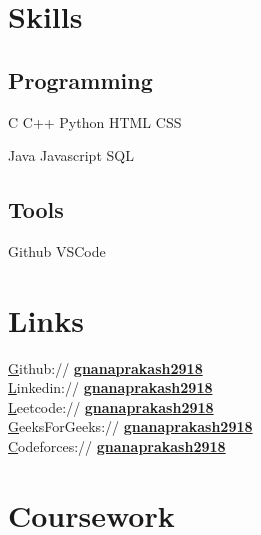 \documentclass[]{deedy-resume-openfont}
\begin{document}
\begin{minipage}[t]{0.33\textwidth}

    \section{Skills}
    \subsection{Programming}
    C \textbullet{} C++ \textbullet{}  Python \textbullet{} HTML \textbullet{} CSS

    Java \textbullet{} Javascript \textbullet{} SQL
    \sectionsep

    \subsection{Tools}
    Github \textbullet{} VSCode


    \section{Links}

    \href{https://github.com/gnanaprakash2918}
    Github:// \href{https://github.com/gnanaprakash2918}{\bf gnanaprakash2918} \\

    \href{https://www.linkedin.com/in/gnanaprakash2918/}
    Linkedin://  \href{https://www.linkedin.com/in/gnanaprakash2918/}{\bf gnanaprakash2918} \\

    \href{https://leetcode.com/gnanaprakash2918/}
    Leetcode://  \href{https://leetcode.com/gnanaprakash2918/}{\bf gnanaprakash2918} \\

    \href{https://auth.geeksforgeeks.org/user/gnanaprakash2918}
    GeeksForGeeks://  \href{https://auth.geeksforgeeks.org/user/gnanaprakash2918}{\bf gnanaprakash2918} \\

    \href{https://codeforces.com/profile/gnanaprakash2918}
    Codeforces://  \href{https://codeforces.com/profile/gnanaprakash2918}{\bf gnanaprakash2918} \\

    \sectionsep




    \section{Coursework}

\end{minipage}
\end{document}
